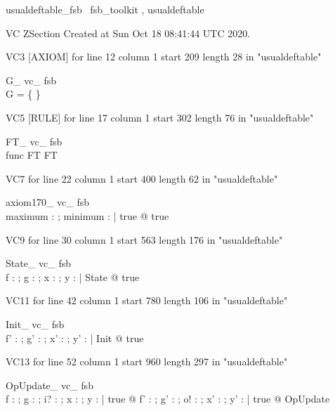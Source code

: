 \documentclass{article}
\begin{document}

\begin{zsection}	 \SECTION usualdeftable\_fsb \parents~fsb\_toolkit , usualdeftable
\end{zsection}

VC ZSection Created at Sun Oct 18 08:41:44 UTC 2020.

VC3 [AXIOM] for line 12 column 1 start 209 length 28 in "usualdeftable"
\begin{theorem}{ G\_ vc\_ fsb}\\
 \lnot G = \{ \} \\

\end{theorem}

VC5 [RULE] for line 17 column 1 start 302 length 76 in "usualdeftable"
\begin{theorem}{ FT\_ vc\_ fsb}\\
 func \in \nat \cross FT \inj FT \\

\end{theorem}

VC7 for line 22 column 1 start 400 length 62 in "usualdeftable"
\begin{theorem}{ axiom170\_ vc\_ fsb}\\
 \exists maximum : \nat ; minimum : \nat | true @ true \\

\end{theorem}

VC9 for line 30 column 1 start 563 length 176 in "usualdeftable"
\begin{theorem}{ State\_ vc\_ fsb}\\
 \exists f : \nat \pfun \nat ; g : \nat ; x : \nat ; y : \power \nat | State @ true \\

\end{theorem}

VC11 for line 42 column 1 start 780 length 106 in "usualdeftable"
\begin{theorem}{ Init\_ vc\_ fsb}\\
 \exists f' : \nat \pfun \nat ; g' : \nat ; x' : \nat ; y' : \power \nat | Init @ true \\

\end{theorem}

VC13 for line 52 column 1 start 960 length 297 in "usualdeftable"
\begin{theorem}{ OpUpdate\_ vc\_ fsb}\\
 \forall f : \nat \pfun \nat ; g : \nat ; i? : \nat ; x : \nat ; y : \power \nat | true @ \exists f' : \nat \pfun \nat ; g' : \nat ; o! : \nat ; x' : \nat ; y' : \power \nat | true @ OpUpdate \\

\end{theorem}
\end{document}

